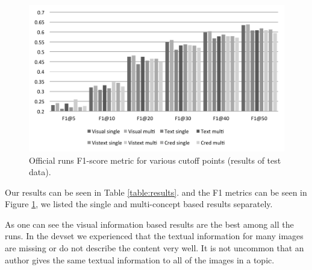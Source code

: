 \documentclass{acm_proc_article-me}
\begin{document}
\begin{figure}[t]
\includegraphics[width=1.0\linewidth]{f1}
\caption{Official runs F1-score metric for various cutoff points (results of test data).}
\label{fig:f1}
\end{figure}

Our results can be seen in Table \ref{table:results}. and the F1 metrics can be seen in Figure \ref{fig:f1}, we listed the single and multi-concept based results separately. 

As one can see the visual information based results are the best among all the runs. In the devset we experienced that the textual information for many images are missing or do not describe the content very well. It is not uncommon that an author gives the same textual information to all of the images in a topic.



\end{document}
